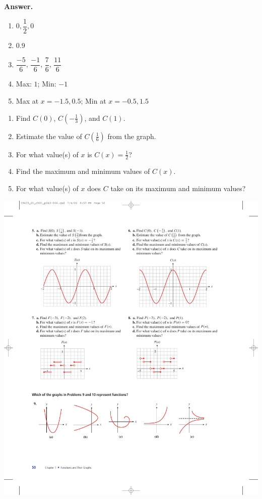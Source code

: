 \documentclass[10pt,]{book}
\theoremstyle{plain}
\theoremstyle{definition}
\theoremstyle{definition}
\theoremstyle{definition}
\theoremstyle{definition}
\numberwithin{equation}{part}
\begin{document}
\begin{exercisegroup}
%
\par\smallskip
\noindent\textbf{Answer.}\hypertarget{answer-95}{}\quad
\leavevmode%
\begin{enumerate}[label=*\alph**]
\item\hypertarget{li-692}{}\(0, \dfrac{1}{2}, 0\)%
\item\hypertarget{li-693}{}\(0.9\)%
\item\hypertarget{li-694}{}\(\dfrac{-5}{6}\), \(\dfrac{-1}{6}\), \(\dfrac{7}{6}\), \(\dfrac{11}{6}\)%
\item\hypertarget{li-695}{}Max: \(1\); Min: \(-1\)%
\item\hypertarget{li-696}{}Max at \(x=-1.5, 0.5\); Min at \(x=-0.5, 1.5\)%
\end{enumerate}
%
\exercise[6.]\hypertarget{exercise-163}{}\leavevmode%
\begin{enumerate}[label=*\alph**]
\item\hypertarget{li-697}{}Find \(C(0)\), \(C\left(-\frac{1}{3}\right)\), and \(C(1)\).%
\item\hypertarget{li-698}{}Estimate the value of \(C\left(\frac{1}{6}\right)\) from the graph.%
\item\hypertarget{li-699}{}For what value(s) of \(x\) is \(C(x) = \frac{1}{2}\)?%
\item\hypertarget{li-700}{}Find the maximum and minimum values of \(C(x)\).%
\item\hypertarget{li-701}{}For what value(s) of \(x\) does \(C\) take on its maximum and minimum values?%
\end{enumerate}
 \includegraphics[width=0.6\linewidth]{images/fig-ex-1-3-6}
%
\exercise[7.]\hypertarget{exercise-164}{}\leavevmode%
\begin{enumerate}[label=*\alph**]

\end{enumerate}
\end{exercisegroup}
\end{document}
